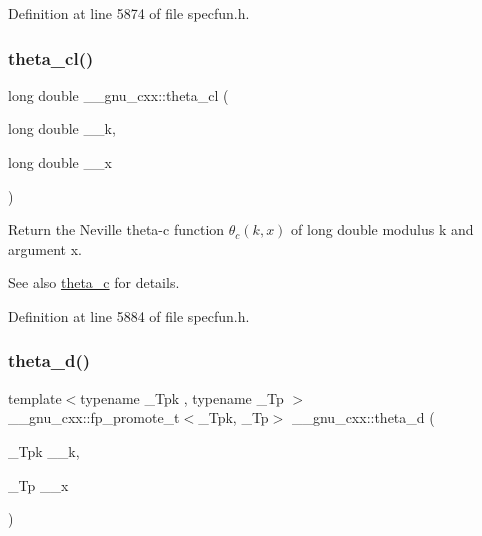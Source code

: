 Definition at line 5874 of file specfun.\+h.

\mbox{\label{group__mathsf__gnu_ga0531098c628999cf396217ff997cfdda}} 
\subsubsection{\texorpdfstring{theta\+\_\+cl()}{theta\_cl()}}
{\footnotesize\ttfamily long double \+\_\+\+\_\+gnu\+\_\+cxx\+::theta\+\_\+cl (\begin{DoxyParamCaption}\item[{long double}]{\+\_\+\+\_\+k,  }\item[{long double}]{\+\_\+\+\_\+x }\end{DoxyParamCaption})\hspace{0.3cm}{\ttfamily [inline]}}

Return the Neville theta-\/c function $ \theta_c(k,x) $ of {\ttfamily long double} modulus {\ttfamily k} and argument {\ttfamily x}.

\begin{DoxySeeAlso}{See also}
\hyperlink{group__mathsf__gnu_ga3ebbb6513c39e1d55b08cba7d169ce3d}{theta\+\_\+c} for details. 
\end{DoxySeeAlso}


Definition at line 5884 of file specfun.\+h.

\mbox{\label{group__mathsf__gnu_ga258edb995137d9e6344b3cd750266d74}} 
\subsubsection{\texorpdfstring{theta\+\_\+d()}{theta\_d()}}
{\footnotesize\ttfamily template$<$typename \+\_\+\+Tpk , typename \+\_\+\+Tp $>$ \\
\+\_\+\+\_\+gnu\+\_\+cxx\+::fp\+\_\+promote\+\_\+t$<$\+\_\+\+Tpk, \+\_\+\+Tp$>$ \+\_\+\+\_\+gnu\+\_\+cxx\+::theta\+\_\+d (\begin{DoxyParamCaption}\item[{\+\_\+\+Tpk}]{\+\_\+\+\_\+k,  }\item[{\+\_\+\+Tp}]{\+\_\+\+\_\+x }\end{DoxyParamCaption})\hspace{0.3cm}{\ttfamily [inline]}}

